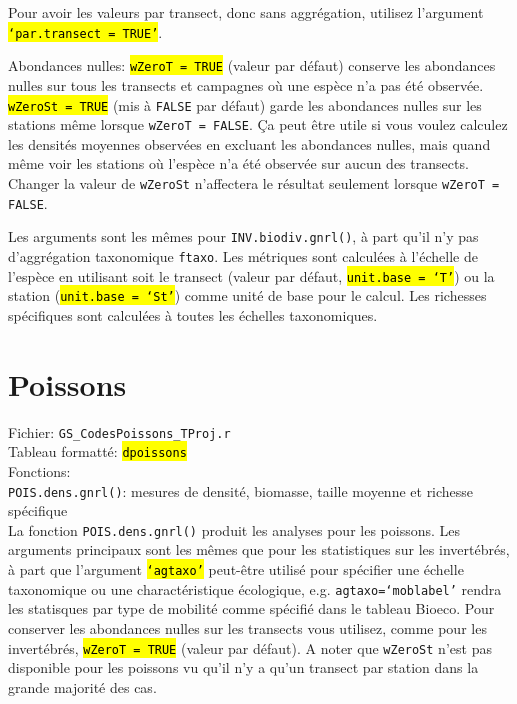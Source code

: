 \documentclass{article}
\begin{document}
Pour avoir les valeurs par transect, donc sans aggrégation, utilisez
l'argument \hl{\texttt{`par.transect = TRUE'}}.

Abondances nulles: \hl{\texttt{wZeroT = TRUE}} (valeur par défaut) conserve
les abondances nulles sur tous les transects et campagnes où une
espèce n'a pas été observée. \hl{\texttt{wZeroSt = TRUE}} (mis à
\texttt{FALSE} par défaut) garde les abondances nulles sur les
stations même lorsque \texttt{wZeroT = FALSE}. Ça peut être utile si vous
voulez calculez les densités moyennes observées en excluant les
abondances nulles, mais quand même voir les stations où l'espèce n'a
été observée sur aucun des transects. Changer la valeur de
\texttt{wZeroSt} n'affectera le résultat seulement lorsque
\texttt{wZeroT = FALSE}.

Les arguments sont les mêmes pour \texttt{INV.biodiv.gnrl()}, à part qu'il n'y
pas d'aggrégation taxonomique \texttt{ftaxo}. Les métriques sont calculées à
l'échelle de l'espèce en utilisant soit le transect (valeur par
défaut, \hl{\texttt{unit.base = `T'}}) ou la station
(\hl{\texttt{unit.base = `St'}}) comme unité de
base pour le calcul. Les richesses spécifiques sont calculées à toutes
les échelles taxonomiques.

\section{Poissons}
Fichier: \texttt{GS\_CodesPoissons\_TProj.r}\\
Tableau formatté: \hl{\texttt{dpoissons}}\\
Fonctions:\\
\texttt{POIS.dens.gnrl()}: mesures de densité, biomasse, taille
moyenne et richesse spécifique\\

La fonction \texttt{POIS.dens.gnrl()} produit les analyses pour
les poissons. Les arguments principaux sont les mêmes que pour les
statistiques sur
les invertébrés, à part que l'argument \hl{\texttt{`agtaxo'}} peut-être utilisé
pour spécifier une échelle taxonomique ou une charactéristique
écologique, e.g. \texttt{agtaxo=`moblabel'} rendra les statisques par
type de mobilité comme spécifié dans le tableau Bioeco. Pour conserver
les abondances nulles sur les transects vous utilisez, comme pour les
invertébrés, \hl{\texttt{wZeroT = TRUE}} (valeur par
défaut). A noter que \texttt{wZeroSt} n'est pas disponible pour les
poissons vu qu'il n'y a qu'un transect par station dans la grande majorité
des cas.
\end{document}
